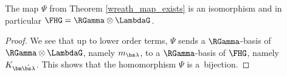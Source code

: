 \begin{theorem} \label{main_thm}
The map $\Psi$ from Theorem \ref{wreath_map_exists} is an isomorphism and in particular $\FHG = \RGamma \otimes \LambdaG$.
\end{theorem}

\begin{proof}
We see that up to lower order terms, $\Psi$ sends a $\RGamma$-basis of $\RGamma \otimes \LambdaG$, namely $m_{\bs\lambda}$, to a $\RGamma$-basis of $\FHG$, namely $K_{\bm\hat{\bs\lambda}}$. This shows that the homomorphism $\Psi$ is a~bijection.
\end{proof}
